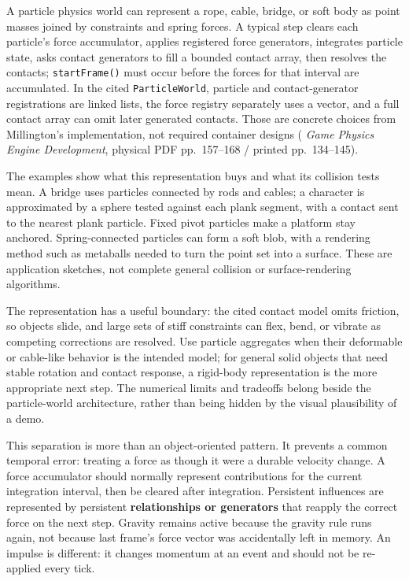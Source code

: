 A particle physics world can represent a rope, cable, bridge, or soft body as point masses joined by constraints and spring forces. A typical step clears each particle's force accumulator, applies registered force generators, integrates particle state, asks contact generators to fill a bounded contact array, then resolves the contacts; \texttt{startFrame()} must occur before the forces for that interval are accumulated. In the cited \texttt{ParticleWorld}, particle and contact-generator registrations are linked lists, the force registry separately uses a vector, and a full contact array can omit later generated contacts. Those are concrete choices from Millington's implementation, not required container designs ( \emph{Game Physics Engine Development}, physical PDF pp.~157--168 / printed pp.~134--145).

The examples show what this representation buys and what its collision tests mean. A bridge uses particles connected by rods and cables; a character is approximated by a sphere tested against each plank segment, with a contact sent to the nearest plank particle. Fixed pivot particles make a platform stay anchored. Spring-connected particles can form a soft blob, with a rendering method such as metaballs needed to turn the point set into a surface. These are application sketches, not complete general collision or surface-rendering algorithms.

The representation has a useful boundary: the cited contact model omits friction, so objects slide, and large sets of stiff constraints can flex, bend, or vibrate as competing corrections are resolved. Use particle aggregates when their deformable or cable-like behavior is the intended model; for general solid objects that need stable rotation and contact response, a rigid-body representation is the more appropriate next step. The numerical limits and tradeoffs belong beside the particle-world architecture, rather than being hidden by the visual plausibility of a demo.

This separation is more than an object-oriented pattern. It prevents a common temporal error: treating a force as though it were a durable velocity change. A force accumulator should normally represent contributions for the current integration interval, then be cleared after integration. Persistent influences are represented by persistent \textbf{relationships or generators} that reapply the correct force on the next step. Gravity remains active because the gravity rule runs again, not because last frame's force vector was accidentally left in memory. An impulse is different: it changes momentum at an event and should not be re-applied every tick.


